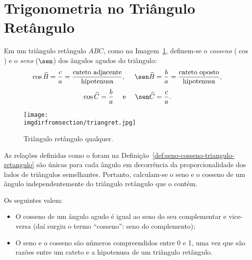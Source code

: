 \section{Trigonometria no Triângulo Retângulo}

\begin{definition}
\label{def:seno-cosseno-triangulo-retangulo}
Em um triângulo retângulo $ABC$, como na Imagem~\ref{fig:triangulo-retangulo}, definem-se o
\emph{cosseno} ($\cos$) e o \emph{seno} ($\sen$) dos ângulos agudos do
triângulo:
%
$$\cos \widehat B = \frac c a = \frac {\text{cateto
adjacente}}{\text{hipotenusa}}, \ \ \ \ \sen \widehat B = \frac b a = \frac
{\text{cateto oposto}}{\text{hipotenusa}},$$
$$\cos \widehat C = \frac b a \ \ \ \ \text{e} \ \ \ \ \sen \widehat
C = \frac c a.$$    
%
\begin{figure}[H]
\centering
\texttt{[image: \\imgdirfromsection/triangret.jpg]}
\caption{Triângulo retângulo qualquer.}
\label{fig:triangulo-retangulo}
\end{figure}
\end{definition}

\begin{remark}
As relações definidas como o foram na Definição~\ref{def:seno-cosseno-triangulo-retangulo} são únicas para cada ângulo em
decorrência da proporcionalidade dos lados de triângulos
semelhantes. Portanto, calculam-se o seno e o cosseno de um ângulo
independentemente do triângulo retângulo que o contém.
\end{remark}

\begin{proposition}
Os seguintes valem:
\begin{itemize}
	\item O cosseno de um ângulo agudo é igual ao seno do seu
	complementar e vice-versa (daí surgiu o termo ``cosseno'': seno do complemento);
	\item O seno e o cosseno são números compreendidos entre 0 e 1, uma vez que são razões entre um cateto 
	e a hipotenusa de um triângulo retângulo.
\end{itemize}
\end{proposition}

